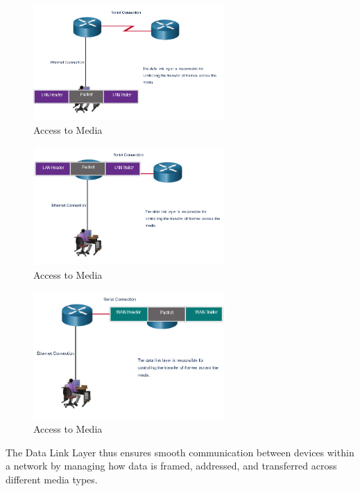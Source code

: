 \documentclass[a4paper,11pt]{article}
\begin{document}
\begin{figure}[h!]
    \centering
    \includegraphics[width=0.65\textwidth]{18.png}
    \caption{Access to Media}
    \label{fig:cap1}
\end{figure}

\begin{figure}[h!]
    \centering
    \includegraphics[width=0.65\textwidth]{19.png}
    \caption{Access to Media}
    \label{fig:cap1}
\end{figure}

\begin{figure}[h!]
    \centering
    \includegraphics[width=0.65\textwidth]{20.png}
    \caption{Access to Media}
    \label{fig:cap1}
\end{figure}

The Data Link Layer thus ensures smooth communication between devices within a network by managing how data is framed, addressed, and transferred across different media types.\\
\end{document}

